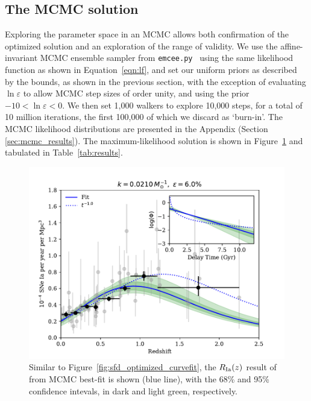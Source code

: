 \documentclass[apj]{aastex62}
\begin{document}
\subsection{The MCMC solution\label{sec:mcmc_sfd}}
Exploring the parameter space in an MCMC allows both confirmation of the optimized solution and an exploration of the range of validity. We use the affine-invariant MCMC ensemble sampler from {\tt emcee.py}~\citep{Foreman-Mackey:2013pd} using the same likelihood function as shown in Equation~\ref{eqn:lf}, and set our uniform priors as described by the bounds, as shown in the previous section, with the exception of evaluating $\ln \varepsilon$ to allow MCMC step sizes of order unity, and using the prior $ -10 < \ln \varepsilon < 0$. We then set 1,000 walkers to explore 10,000 steps, for a total of 10 million iterations, the first 100,000 of which we discard as `burn-in'. The MCMC likelihood distributions are presented in the Appendix (Section \ref{sec:mcmc_results}). The maximum-likelihood solution is shown in Figure~\ref{fig:figure_fit_demo_werr} and tabulated in Table~\ref{tab:results}.



\begin{figure}[t]
   \centering
   \includegraphics[width=6.5in]{figure_fit_demo_werr} 
   \caption{\footnotesize Similar to Figure~\ref{fig:sfd_optimized_curvefit}, the $R_{\rm Ia}(z)$ result of from MCMC best-fit is shown (blue line), with the 68\% and 95\% confidence intevals, in dark and light green, respectively. }
   \label{fig:figure_fit_demo_werr}
\end{figure}
\end{document}
